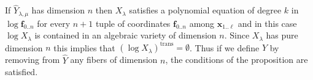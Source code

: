 \documentclass[reqno]{amsart}
\renewcommand\~[1]{\widetilde{#1}}
\def\vf{{\mathbf f}}
\def\vx{{\mathbf x}}
\def\trans{\mathrm{trans}}
\begin{document}
If $\hat Y_{\lambda,\mu}$ has dimension $n$ then $X_\lambda$ satisfies
a polynomial equation of degree $k$ in $\log\vf_{0..n}$ for every
$n+1$ tuple of coordinates $\vf_{0..n}$ among $\vx_{1..\ell}$ and in
this case $\log X_\lambda$ is contained in an algebraic variety of
dimension $n$. Since $X_\lambda$ has pure dimension $n$ this implies
that $(\log X_\lambda)^\trans=\emptyset$. Thus if we define $Y$ by
removing from $\hat Y$ any fibers of dimension $n$, the conditions of
the proposition are satisfied.



\end{document}
